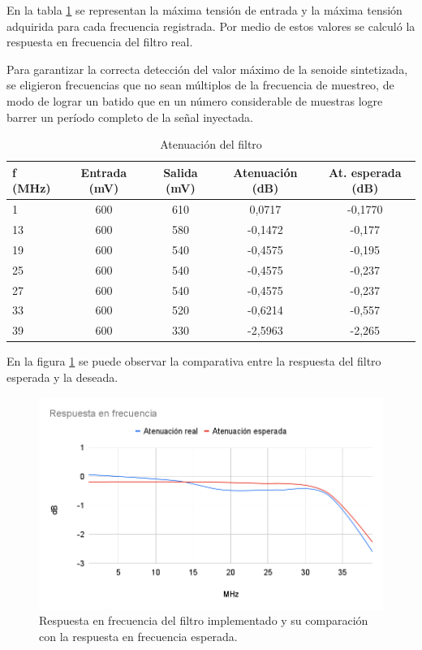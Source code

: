 \vspace{5mm}

En la tabla \ref{tab:tensiones} se representan la máxima tensión de entrada y la máxima tensión adquirida para cada frecuencia registrada. Por medio de estos valores se calculó la respuesta en frecuencia del filtro real.
 
Para garantizar la correcta detección del valor máximo de la senoide sintetizada, se eligieron frecuencias que no sean múltiplos de la frecuencia de muestreo, de modo de lograr un batido que en un número considerable de muestras logre barrer un período completo de la señal inyectada.
 
\vspace{5mm}

\begin{table}[h]
\centering
\caption[Antenuación del filtro.]{Atenuación del filtro}
\begin{tabular*}{\textwidth}{l c c c c}
\toprule
\textbf{f (MHz)} & \textbf{Entrada (mV)} & \textbf{Salida (mV)} & \textbf{Atenuación (dB)} & \textbf{At. esperada (dB)}\\
\midrule
1 & 600 & 610 & 0,0717 & -0,1770 \\
13 & 600 & 580 & -0,1472 & -0,177 \\
19 & 600 & 540 & -0,4575 & -0,195 \\
25 & 600 & 540 & -0,4575 & -0,237 \\
27 & 600 & 540 & -0,4575 & -0,237 \\
33 & 600 & 520 & -0,6214 & -0,557 \\
39 & 600 & 330 & -2,5963 & -2,265 \\
\bottomrule
\hline
\end{tabular*}
\label{tab:tensiones}
\end{table}

\newpage

En la figura \ref{fig:respFrecReal} se puede observar la comparativa entre la respuesta del filtro esperada y la deseada.


\begin{figure}[ht]
	\centering
	\includegraphics[width=140mm]{./Figures/respFrecReal.png}
	\caption{Respuesta en frecuencia del filtro implementado y su comparación con la respuesta en frecuencia esperada.}
	\label{fig:respFrecReal}
\end{figure}

